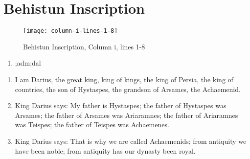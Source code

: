 \section{Behistun Inscription}

\begin{figure}[H]
    \texttt{[image: column-i-lines-1-8]}
    \caption{Behistun Inscription, Column i, lines 1-8\cite{BehistunT01}}
\end{figure}

\begin{enumerate}
    \item {\oldpersian ;adm;dal}
\end{enumerate}

\begin{enumerate}
    \item I am Darius, the great king, king of kings, the king of Persia, the king of countries, the son of Hystaspes,
         the grandson of Arsames, the Achaemenid.
    \item King Darius says: My father is Hystaspes; the father of Hystaspes was Arsames; the father of Arsames was
          Ariaramnes; the father of Ariaramnes was Teispes; the father of Teispes was Achaemenes.
    \item King Darius says: That is why we are called Achaemenids; from antiquity we have been noble; from antiquity
          has our dynasty been royal.
\end{enumerate}
